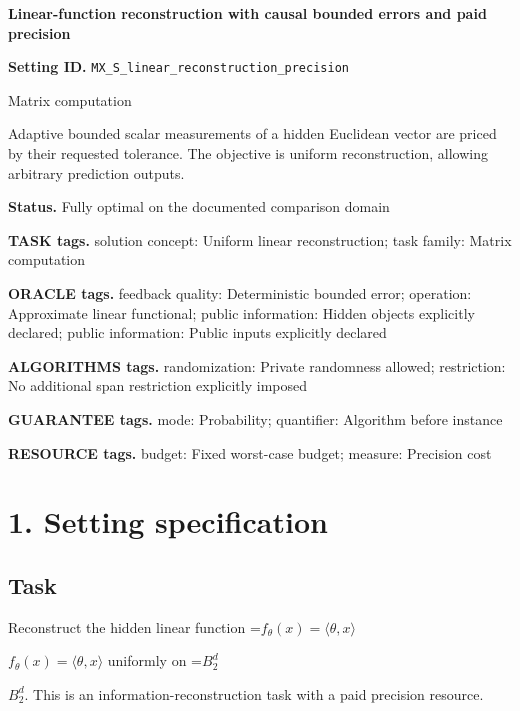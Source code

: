 \documentclass[10pt,a4paper]{article}
\newcommand{\AtlasMath}[1]{\par\begingroup\centering\setbox0=\hbox{$\displaystyle #1$}\ifdim\wd0>1.4\linewidth\typeout{ATLAS WIDE FORMULA: \the\wd0}\fi\ifdim\wd0>\linewidth\resizebox{\linewidth}{!}{\box0}\else\box0\fi\par\endgroup}
\newcommand{\AtlasInlineMath}[1]{\begingroup\setbox0=\hbox{$#1$}\ifdim\wd0>.4\linewidth\endgroup\AtlasMath{#1}\else\endgroup$#1$\fi}
\begin{document}
\raggedright

{\LARGE\bfseries\sffamily\color{AtlasNavy} Linear-function reconstruction with causal bounded errors and paid precision\par}\vspace{5pt}


\textbf{Setting ID.} \texttt{MX\_\allowbreak{}S\_\allowbreak{}linear\_\allowbreak{}reconstruction\_\allowbreak{}precision}



Matrix computation



Adaptive bounded scalar measurements of a hidden Euclidean vector are priced by their requested tolerance. The objective is uniform reconstruction, allowing arbitrary prediction outputs.



\textbf{Status.} Fully optimal on the documented comparison domain



\textbf{TASK tags.} solution concept: Uniform linear reconstruction; task family: Matrix computation



\textbf{ORACLE tags.} feedback quality: Deterministic bounded error; operation: Approximate linear functional; public information: Hidden objects explicitly declared; public information: Public inputs explicitly declared



\textbf{ALGORITHMS tags.} randomization: Private randomness allowed; restriction: No additional span restriction explicitly imposed



\textbf{GUARANTEE tags.} mode: Probability; quantifier: Algorithm before instance



\textbf{RESOURCE tags.} budget: Fixed worst-case budget; measure: Precision cost



\section{1. Setting specification}


\subsection{Task}


Reconstruct the hidden linear function \AtlasInlineMath{f_\theta(x)=\langle\theta,x\rangle} uniformly on \AtlasInlineMath{B_2^d}. This is an information-reconstruction task with a paid precision resource.
\end{document}
